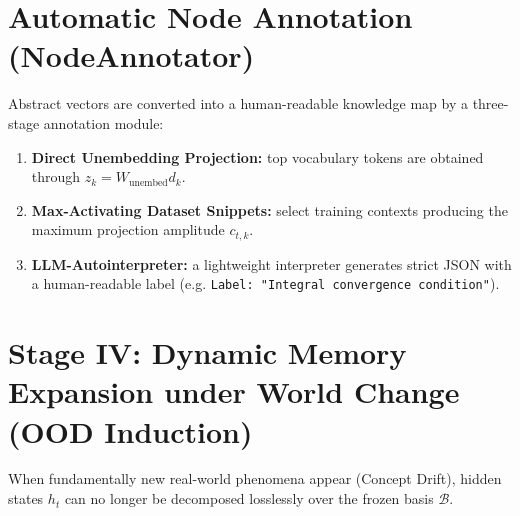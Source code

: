\documentclass[11pt,a4paper]{article}
\begin{document}
\section{Automatic Node Annotation (NodeAnnotator)}
Abstract vectors are converted into a human-readable knowledge map by a three-stage annotation module:
\begin{center}
\end{center}
\begin{enumerate}
\item \textbf{Direct Unembedding Projection:} top vocabulary tokens are obtained through $z_k=W_{\text{unembed}}d_k$.
\item \textbf{Max-Activating Dataset Snippets:} select training contexts producing the maximum projection amplitude $c_{t,k}$.
\item \textbf{LLM-Autointerpreter:} a lightweight interpreter generates strict JSON with a human-readable label (e.g. \texttt{Label: "Integral convergence condition"}).
\end{enumerate}

\section{Stage IV: Dynamic Memory Expansion under World Change (OOD Induction)}
When fundamentally new real-world phenomena appear (Concept Drift), hidden states $h_t$ can no longer be decomposed losslessly over the frozen basis $\mathcal B$.
\end{document}
